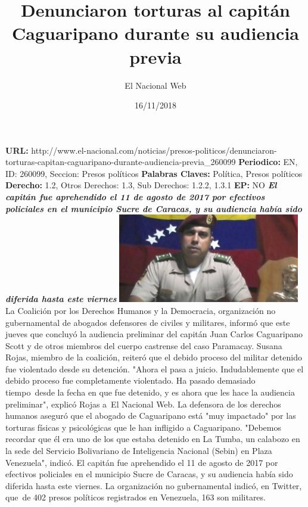 \documentclass{article}%
\title{\textbf{Denunciaron torturas al capitán Caguaripano durante su audiencia previa}}%
\author{El Nacional Web}%
\date{16/11/2018}%
\begin{document}
%
\normalsize%
\maketitle%
\textbf{URL: }%
http://www.el{-}nacional.com/noticias/presos{-}politicos/denunciaron{-}torturas{-}capitan{-}caguaripano{-}durante{-}audiencia{-}previa\_260099\newline%
%
\textbf{Periodico: }%
EN, %
ID: %
260099, %
Seccion: %
Presos políticos\newline%
%
\textbf{Palabras Claves: }%
Política, Presos políticos\newline%
%
\textbf{Derecho: }%
1.2, %
Otros Derechos: %
1.3, %
Sub Derechos: %
1.2.2, 1.3.1\newline%
%
\textbf{EP: }%
NO\newline%
\newline%
%
\textbf{\textit{El capitán fue aprehendido el 11 de agosto de 2017 por efectivos policiales en el municipio Sucre de Caracas, y su audiencia había sido diferida hasta este viernes}}%
\newline%
\newline%
%
\includegraphics[width=300px]{58.jpg}%
\newline%
%
La Coalición por los Derechos Humanos y la Democracia, organización no gubernamental de abogados defensores de civiles y militares, informó que este jueves que concluyó la audiencia preliminar del capitán Juan Carlos Caguaripano Scott y de otros miembros del cuerpo castrense del caso Paramacay.%
\newline%
%
Susana Rojas, miembro de la coalición, reiteró que el debido proceso del militar detenido fue violentado desde su detención.%
\newline%
%
"Ahora el pasa a juicio. Indudablemente que el debido proceso fue completamente violentado. Ha pasado demasiado tiempo~desde la fecha en que fue detenido, y es ahora que les hace la audiencia preliminar", explicó Rojas a~El Nacional Web.%
\newline%
%
La defensora de los derechos humanos aseguró que el abogado de Caguaripano está "muy impactado" por las torturas físicas y psicológicas que le han infligido a Caguaripano.%
\newline%
%
"Debemos recordar que él era uno de los que estaba detenido en La Tumba, un calabozo en la sede del Servicio Bolivariano de Inteligencia Nacional (Sebin) en Plaza Venezuela", indicó.%
\newline%
%
El capitán fue aprehendido el 11 de agosto de 2017 por efectivos policiales en el municipio Sucre de Caracas, y su audiencia había sido diferida hasta este viernes.%
\newline%
%
La organización no gubernamental indicó, en Twitter, que~de 402 presos políticos registrados en Venezuela, 163 son militares.%
\newline%
%
\end{document}
